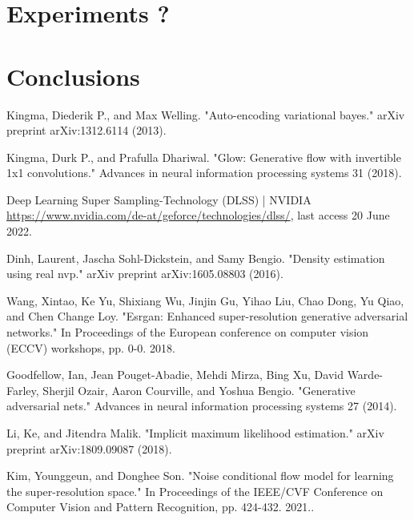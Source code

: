 \documentclass{article}
\begin{document}
\section{Experiments ?}\label{sec:eval}
\newpage
\section{Conclusions}\label{sec:conc}


\newpage
\begin{thebibliography}{9}

    Kingma, Diederik P., and Max Welling. "Auto-encoding variational bayes." arXiv preprint arXiv:1312.6114 (2013).

    Kingma, Durk P., and Prafulla Dhariwal. "Glow: Generative flow with invertible 1x1 convolutions." Advances in neural information processing systems 31 (2018).

    Deep Learning Super Sampling-Technology (DLSS) | NVIDIA\\
    \url{https://www.nvidia.com/de-at/geforce/technologies/dlss/}, last access 20 June 2022.
    
    Dinh, Laurent, Jascha Sohl-Dickstein, and Samy Bengio. "Density estimation using real nvp." arXiv preprint arXiv:1605.08803 (2016).

    Wang, Xintao, Ke Yu, Shixiang Wu, Jinjin Gu, Yihao Liu, Chao Dong, Yu Qiao, and Chen Change Loy. "Esrgan: Enhanced super-resolution generative adversarial networks." In Proceedings of the European conference on computer vision (ECCV) workshops, pp. 0-0. 2018.

    Goodfellow, Ian, Jean Pouget-Abadie, Mehdi Mirza, Bing Xu, David Warde-Farley, Sherjil Ozair, Aaron Courville, and Yoshua Bengio. "Generative adversarial nets." Advances in neural information processing systems 27 (2014).

    Li, Ke, and Jitendra Malik. "Implicit maximum likelihood estimation." arXiv preprint arXiv:1809.09087 (2018).

    Kim, Younggeun, and Donghee Son. "Noise conditional flow model for learning the super-resolution space." In Proceedings of the IEEE/CVF Conference on Computer Vision and Pattern Recognition, pp. 424-432. 2021..


\end{thebibliography}
\end{document}
